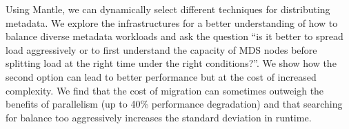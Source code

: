Using Mantle, we can dynamically select different techniques for distributing
metadata. We explore the infrastructures for a better understanding of how to
balance diverse metadata workloads and ask the question ``is it better to
spread load aggressively or to first understand the capacity of MDS nodes
before splitting load at the right time under the right conditions?''. We show
how the second option can lead to better performance but at the cost of
increased complexity. We find that the cost of migration can sometimes outweigh
the benefits of parallelism (up to 40\% performance degradation) and that
searching for balance too aggressively increases the standard deviation in
runtime.

